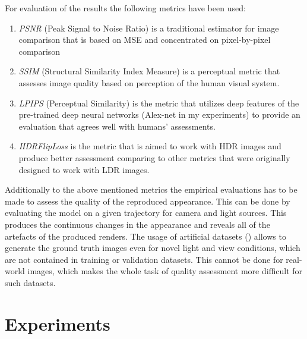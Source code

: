 For evaluation of the results the following metrics have been used:
\begin{enumerate}
    \item \textit{PSNR} \cite{hore2010image} (Peak Signal to Noise Ratio) is a traditional estimator for image comparison
    that is based on MSE and concentrated on pixel-by-pixel comparison
    \item \textit{SSIM} \cite{zhou2004image, nilsson2020understanding, hore2010image} (Structural Similarity Index Measure) is a perceptual metric
    that assesses image quality based on perception of the human visual system.
    \item \textit{LPIPS} \cite{zhang2018perceptual} (Perceptual Similarity) is the metric
    that utilizes deep features of the pre-trained deep neural networks (Alex-net \cite{krizhevsky2012imagenet} in my experiments)
    to provide an evaluation that agrees well with humans' assessments.
    \item \textit{HDRFlipLoss} \cite{theisel2021hdrflip, andersson2020flip} is the metric
    that is aimed to work with HDR images and produce better assessment comparing to other metrics
    that were originally designed to work with LDR images.
\end{enumerate}

Additionally to the above mentioned metrics the empirical evaluations has to be made
to assess the quality of the reproduced appearance.
This can be done by evaluating the model on a given trajectory for camera and light sources.
This produces the continuous changes in the appearance and reveals all of the artefacts of the produced renders.
The usage of artificial datasets () allows to generate the ground truth images
even for novel light and view conditions, which are not contained in training or validation datasets.
This cannot be done for real-world images, which makes the whole task of quality assessment more difficult for such datasets.


\section{Experiments}

